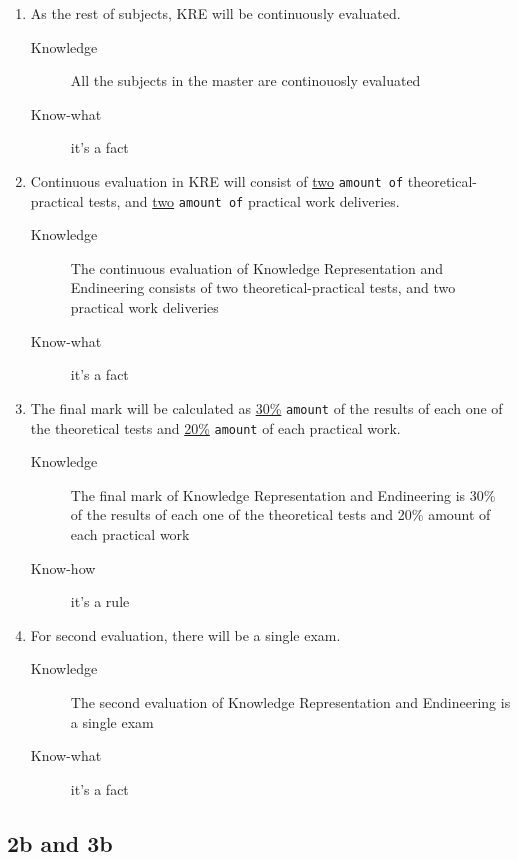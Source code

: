 \documentclass[a4paper,10pt,twoside,twocolumn]{article}
\begin{document}
\begin{enumerate}
\begin{description}
\end{description}
\item As the rest of subjects, KRE will be continuously evaluated.
\begin{description}
\item[{Knowledge}] All the subjects in the master are continouosly evaluated
\item[{Know-what}] it's a fact
\end{description}
\item Continuous evaluation in KRE will consist of \uline{two} \texttt{amount of} theoretical-practical tests, and \uline{two} \texttt{amount of} practical work deliveries.
\begin{description}
\item[{Knowledge}] The continuous evaluation of Knowledge Representation and Endineering consists of two theoretical-practical tests, and two practical work deliveries
\item[{Know-what}] it's a fact
\end{description}
\item The final mark will be calculated as \uline{30\%} \texttt{amount} of the results of each one of the theoretical tests and \uline{20\%} \texttt{amount} of each practical work.
\begin{description}
\item[{Knowledge}] The final mark of Knowledge Representation and Endineering is 30\% of the results of each one of the theoretical tests and 20\% amount of each practical work
\item[{Know-how}] it's a rule
\end{description}
\item For second evaluation, there will be a single exam.
\begin{description}
\item[{Knowledge}] The second evaluation of Knowledge Representation and Endineering is a single exam
\item[{Know-what}] it's a fact
\end{description}
\end{enumerate}

\subsection{2b and 3b}
\label{sec:org61e6af4}
\end{document}
